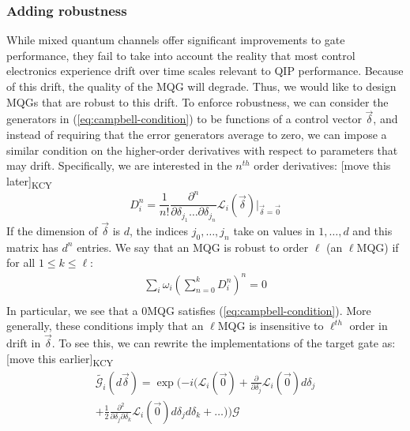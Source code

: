 \documentclass[aps,nofootinbib,pra,notitlepage,twocolumn]{revtex4-1}
\newcommand{\kcy}[1]{{\color{red}[#1]\textsubscript{\rm{KCY}}}}
\begin{document}
\subsubsection{Adding robustness} %
\label{sub:adding_robustness}
While mixed quantum channels offer significant improvements to gate performance, they fail to take into account the reality that most control electronics experience drift over time scales relevant to QIP performance. Because of this drift, the quality of the MQG will degrade. Thus, we would like to design MQGs that are robust to this drift. To enforce robustness, we can consider the generators in (\ref{eq:campbell-condition}) to be functions of a control vector $\vec{\delta}$, and instead of requiring that the error generators average to zero, we can impose a similar condition on the higher-order derivatives with respect to parameters that may drift. Specifically, we are interested in the $n^{th}$ order derivatives:
\kcy{move this later}
\begin{equation}
\label{eq:derivative}
D^n_i = \frac{1}{n!}\frac{\partial^{n}}{\partial\delta_{j_1}\ldots\partial\delta_{j_n}}\mathcal{L}_i(\vec{\delta})|_{\vec{\delta}=\vec{0}}
\end{equation}
If the dimension of $\vec{\delta}$ is $d$, the indices $j_0, \ldots, j_n$ take on values in $1, \ldots, d$ and this matrix has $d^n$ entries. 
We say that an MQG is robust to order $\ell$ (an $\ell$MQG) if for all $1 \leq k \leq \ell$:
\begin{equation}\label{eq:MQG}
\begin{gathered}
\sum_i\omega_i(\sum_{n=0}^k D^n_i)^n = 0\\
\end{gathered}
\end{equation}
In particular, we see that a 0MQG satisfies (\ref{eq:campbell-condition}). More generally, these conditions imply that an $\ell$MQG is insensitive to $\ell^{th}$ order in drift in $\vec{\delta}$. To see this, we can rewrite the implementations of the target gate as:
\kcy{move this earlier}
\begin{equation}\label{eq:taylor}
\begin{gathered}
\tilde{\mathcal{G}_i}(d\vec{\delta}) = \exp(-i(\mathcal{L}_i(\vec{0}) + \frac{\partial}{\partial\delta_j}\mathcal{L}_i(\vec{0})d\delta_j\\ +  \frac{1}{2}\frac{\partial^2}{\partial\delta_j\partial\delta_k} \mathcal{L}_i(\vec{0})d\delta_j d\delta_k + \ldots))\mathcal{G}
\end{gathered}
\end{equation}
\end{document}
